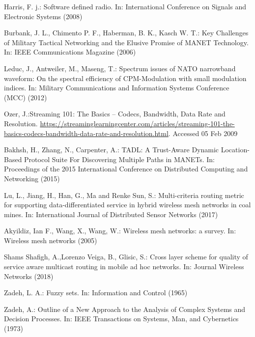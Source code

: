 \documentclass[runningheads]{llncs}
\begin{document}
%
%
%
%
\begin{thebibliography}{5}
%

Harris, F. j.: Software defined radio. In: International Conference on Signals and Electronic Systems (2008) 

Burbank, J. L., Chimento P. F., Haberman, B. K., Kasch W. T.: Key Challenges of Military Tactical Networking and the Elusive Promise of MANET Technology. In: IEEE Communications Magazine (2006)

Leduc, J., Antweiler, M., Maseng, T.: Spectrum issues of NATO narrowband waveform: On the spectral efficiency of CPM-Modulation with small modulation indices. In: Military Communications and Information Systems Conference (MCC) (2012)

Ozer, J.:Streaming 101: The Basics – Codecs, Bandwidth, Data Rate and Resolution. \url{https://streaminglearningcenter.com/articles/streaming-101-the-basics-codecs-bandwidth-data-rate-and-resolution.html}. Accessed 05 Feb 2009

Bakhsh, H., Zhang, N., Carpenter, A.: TADL: A Trust-Aware Dynamic Location-Based Protocol Suite For Discovering Multiple Paths in MANETs. In: Proceedings of the 2015 International Conference on Distributed Computing and Networking (2015)

Lu, L., Jiang, H., Han, G., Ma and Renke Sun, S.: Multi-criteria routing metric for supporting data-differentiated service in hybrid wireless mesh networks in coal mines. In: International Journal of Distributed Sensor Networks (2017)

Akyildiz, Ian F., Wang, X., Wang, W.: Wireless mesh networks: a survey. In: Wireless mesh networks (2005)

Shams Shafigh, A.,Lorenzo Veiga, B., Glisic, S.: Cross layer scheme for quality of service aware multicast routing in mobile ad hoc networks. In: Journal
Wireless Networks (2018)

Zadeh, L. A.: Fuzzy sets. In: Information and Control (1965)

Zadeh, A.: Outline of a New Approach to the Analysis of Complex Systems and Decision Processes. In: IEEE Transactions on Systems, Man, and Cybernetics (1973)


\end{thebibliography}
\end{document}
